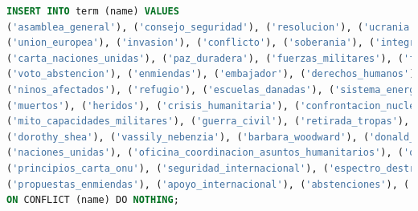 \documentclass[twoside]{article}
\begin{document}
\begin{lstlisting}[language=SQL,caption={Inserting Terms},label={lst:insertterms}]
INSERT INTO term (name) VALUES
('asamblea_general'), ('consejo_seguridad'), ('resolucion'), ('ucrania'), ('rusia'), ('estados_unidos'),
('union_europea'), ('invasion'), ('conflicto'), ('soberania'), ('integridad_territorial'), ('hostilidades'),
('carta_naciones_unidas'), ('paz_duradera'), ('fuerzas_militares'), ('fronteras_internacionalmente_reconocidas'),
('voto_abstencion'), ('enmiendas'), ('embajador'), ('derechos_humanos'), ('ayuda_humanitaria'), ('victimas_civiles'),
('ninos_afectados'), ('refugio'), ('escuelas_danadas'), ('sistema_energetico'), ('calefaccion'), ('electricidad'),
('muertos'), ('heridos'), ('crisis_humanitaria'), ('confrontacion_nuclear'), ('orden_internacional'), ('solidaridad'),
('mito_capacidades_militares'), ('guerra_civil'), ('retirada_tropas'), ('camino_paz'), ('vetos'), ('mariana_betsa'),
('dorothy_shea'), ('vassily_nebenzia'), ('barbara_woodward'), ('donald_trump'), ('kiev'), ('moscu'), ('onu'),
('naciones_unidas'), ('oficina_coordinacion_asuntos_humanitarios'), ('ocha'), ('resolucion_pacifica_disputas'),
('principios_carta_onu'), ('seguridad_internacional'), ('espectro_destruccion_total'), ('causa_profunda_conflicto'),
('propuestas_enmiendas'), ('apoyo_internacional'), ('abstenciones'), ('votos_favor'), ('votos_contra')
ON CONFLICT (name) DO NOTHING;
\end{lstlisting}
\end{document}
